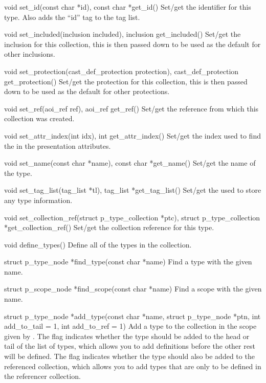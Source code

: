 \begin{cprototypelist}
  \item[void set_id(const char *id), const char *get_id()] Set/get
  the identifier for this \IDL{} type.  Also adds the ``id'' tag to the tag
  list.

  \item[void set_included(inclusion included), inclusion
  get_included()]  Set/get the inclusion for this collection, this is then
  passed down to be used as the default for other inclusions.

  \item[void set_protection(cast_def_protection protection),
  cast_def_protection get_protection()] Set/get the \CAST{} protection for this
  collection, this is then passed down to be used as the default for other
  protections.

  \item[void set_ref(aoi_ref ref), aoi_ref get_ref()] Set/get the
  \AOI{} reference from which this collection was created.

  \item[void set_attr_index(int idx), int get_attr_index()] Set/get
  the index used to find the  in the presentation attributes.

  \item[void set_name(const char *name), const char *get_name()]
  Set/get the name of the type.

  \item[void set_tag_list(tag_list *tl), tag_list *get_tag_list()]
  Set/get the  used to store any type information.

  \item[void set_collection_ref(struct p_type_collection *ptc),
  struct p_type_collection *get_collection_ref()] Set/get the collection
  reference for this type.

  \item[void define_types()] Define all of the types in the
  collection.

  \item[struct p_type_node *find_type(const char *name)] Find a
  type with the given name.

  \item[struct p_scope_node *find_scope(const char *name)] Find a
  scope with the given name.

  \item[struct p_type_node *add_type(const char *name, struct
  p_type_node *ptn, int add_to_tail = 1, int add_to_ref = 1)] Add a type to the
  collection in the scope given by .  The
   flag indicates whether the type should be added to
  the head or tail of the list of types, which allows you to add definitions
  before the other rest will be defined.  The  flag
  indicates whether the type should also be added to the referenced collection,
  which allows you to add types that are only to be defined in the referencer
  collection.


\end{cprototypelist}
